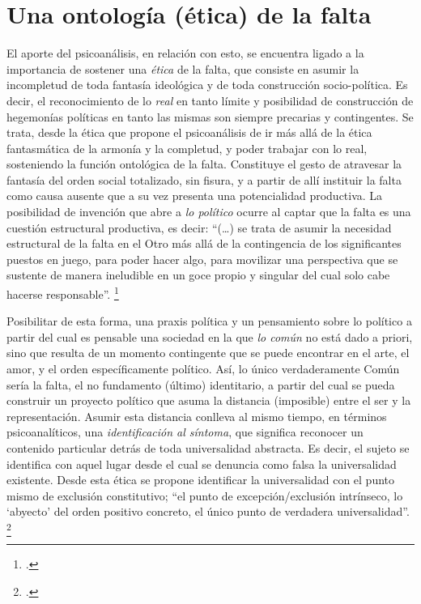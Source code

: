 \section{Una ontología (ética) de la falta}

El aporte del psicoanálisis, en relación con esto, se encuentra ligado a la importancia de sostener una \emph{ética} de la falta, que consiste en asumir la incompletud de toda fantasía ideológica y de toda construcción socio-política. Es decir, el reconocimiento de lo \emph{real} en tanto límite y posibilidad de construcción de hegemonías políticas en tanto las mismas son siempre precarias y contingentes. Se trata, desde la ética que propone el psicoanálisis de ir más allá de la ética fantasmática de la armonía y la completud, y poder trabajar con lo real, sosteniendo la función ontológica de la falta. Constituye el gesto de atravesar la fantasía del orden social totalizado, sin fisura, y a partir de allí instituir la falta como causa ausente que a su vez presenta una potencialidad productiva. La posibilidad de invención que abre a \emph{lo político} ocurre al captar que la falta es una cuestión estructural productiva, es decir: \enquote{(\ldots) se trata de asumir la necesidad estructural de la falta en el Otro más allá de la contingencia de los significantes puestos en juego, para poder hacer algo, para movilizar una perspectiva que se sustente de manera ineludible en un goce propio y singular del cual solo cabe hacerse responsable}. \footcite[][8]{@7071-FARRAN2009}

Posibilitar de esta forma, una praxis política y un pensamiento sobre lo político a partir del cual es pensable una sociedad en la que \emph{lo común} no está dado a priori, sino que resulta de un momento contingente que se puede encontrar en el arte, el amor, y el orden específicamente político. Así, lo único verdaderamente Común sería la falta, el no fundamento (último) identitario, a partir del cual se pueda construir un proyecto político que asuma la distancia (imposible) entre el ser y la representación. Asumir esta distancia conlleva al mismo tiempo, en términos psicoanalíticos, una \emph{identificación al síntoma}, que significa reconocer un contenido particular detrás de toda universalidad abstracta. Es decir, el sujeto se identifica con aquel lugar desde el cual se denuncia como falsa la universalidad existente. Desde esta ética se propone identificar la universalidad con el punto mismo de exclusión constitutivo; \enquote{el punto de excepción/exclusión intrínseco, lo \enquote{abyecto} del orden positivo concreto, el único punto de verdadera universalidad}. \footcite[][244]{@7063-ZIZEK2005}

